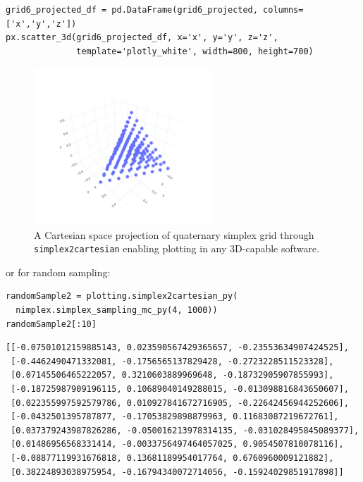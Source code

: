 \begin{verbatim}
grid6_projected_df = pd.DataFrame(grid6_projected, columns=['x','y','z'])
px.scatter_3d(grid6_projected_df, x='x', y='y', z='z', 
              template='plotly_white', width=800, height=700)
\end{verbatim}

\begin{figure}[H]
    \centering
    \includegraphics[width=0.6\textwidth]{nimplexTutorial1/01.QuickStart_30_0.pdf}
    \caption{A Cartesian space projection of quaternary simplex grid through \texttt{simplex2cartesian} enabling plotting in any 3D-capable software.}
    \label{nimplextutorial1:fig:quaternarygridprojected}
\end{figure}


or for random sampling:

\begin{verbatim}
randomSample2 = plotting.simplex2cartesian_py(
  nimplex.simplex_sampling_mc_py(4, 1000))
randomSample2[:10]
\end{verbatim}

\begin{verbatim}
[[-0.07501012159885143, 0.023590567429365657, -0.23553634907424525],
 [-0.4462490471332081, -0.1756565137829428, -0.2723228511523328],
 [0.07145506465222057, 0.3210603889969648, -0.18732905907855993],
 [-0.18725987909196115, 0.10689040149288015, -0.013098816843650607],
 [0.022355997592579786, 0.010927841672716905, -0.22642456944252606],
 [-0.0432501395787877, -0.17053829898879963, 0.11683087219672761],
 [0.037379243987826286, -0.050016213978314135, -0.031028495845089377],
 [0.01486956568331414, -0.0033756497464057025, 0.9054507810078116],
 [-0.08877119931676818, 0.13681189954017764, 0.6760960009121882],
 [0.38224893038975954, -0.16794340072714056, -0.15924029851917898]]
\end{verbatim}

